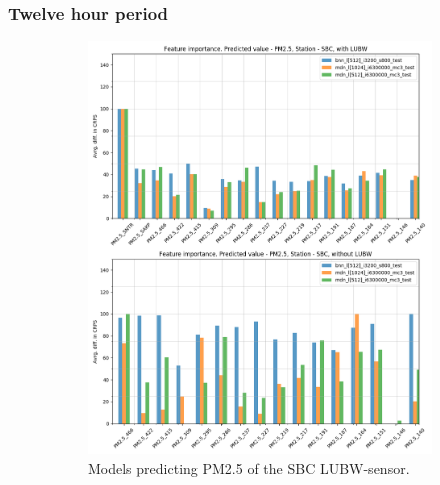 \documentclass[12pt,a4paper,twoside]{scrartcl}
\numberwithin{equation}{section}
\begin{document}
\subsubsection{Twelve hour period}
\begin{figure}[H]
  \centering
  \begin{subfigure}[t]{0.49\textwidth}
    \includegraphics[width=\textwidth,height=1.2\textwidth]{figures/figs_12h/feature_importance_CRPS_SBC_P2}%
    \caption{Models predicting PM2.5 of the SBC LUBW-sensor.}
  \end{subfigure}
  \begin{subfigure}[t]{0.49\textwidth}

\end{subfigure}
\end{figure}
\end{document}

